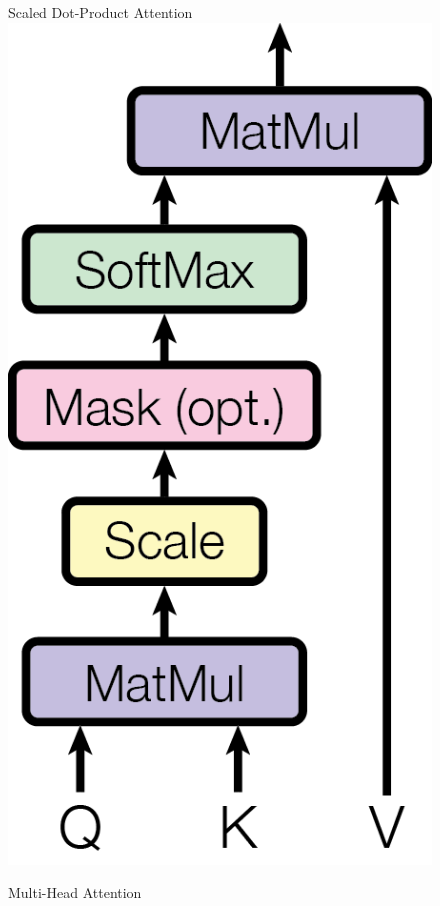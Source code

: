 \begin{figure}
    \begin{minipage}[t]{0.5\textwidth}
      \centering
      Scaled Dot-Product Attention \n
      \vspace{0.5cm}
      \includegraphics[scale=0.7]{gfx/ModalNet-19}
    \end{minipage}
    \begin{minipage}[t]{0.5\textwidth}
      \centering 
      Multi-Head Attention \n
      \vspace{0.1cm}

\end{minipage}
\end{figure}
